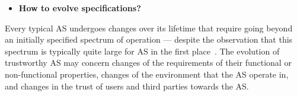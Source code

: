\documentclass[sigconf,nonacm]{acmart}%
\begin{document}
	
	\begin{itemize}[leftmargin=0.5cm]
		\item \textbf{How to evolve specifications?}
	\end{itemize}
	Every typical AS undergoes changes over its lifetime that require going beyond an initially specified spectrum of operation --- despite the observation that this spectrum is typically quite large for AS in the first place~\cite{wilson2019amalgamation}. The evolution of trustworthy AS may concern changes of the requirements of their functional or non-functional properties, changes of the environment that the AS operate in, and changes in the trust of users and third parties towards the AS. 
 
\end{document}
